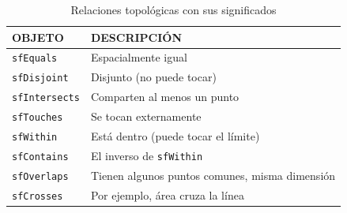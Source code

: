 \begin{table}[H]
	\caption{Relaciones topológicas con sus significados}
	\label{topo-geosparql}
	\centering
	\begin{tabular}{|l|l|}
		\hline
		\rowcolor[HTML]{EFEFEF} 
		{\textbf{OBJETO}} & { \textbf{DESCRIPCIÓN}} \\ \hline
		\texttt{sfEquals}	&              Espacialmente igual           \\ \hline
		\texttt{sfDisjoint}	&        Disjunto (no puede tocar)                 \\ \hline
		\texttt{sfIntersects}	&     Comparten al menos un punto                    \\ \hline
		\texttt{sfTouches} &          Se tocan externamente               \\ \hline
		\texttt{sfWithin}	&      Está dentro (puede tocar el límite)                   \\ \hline
		\texttt{sfContains} &             El inverso de \texttt{sfWithin}            \\ \hline
		\texttt{sfOverlaps}	&            Tienen algunos puntos comunes, misma dimensión             \\ \hline
		\texttt{sfCrosses} &         Por ejemplo, área cruza la línea                \\ \hline		
	\end{tabular}
\end{table}

